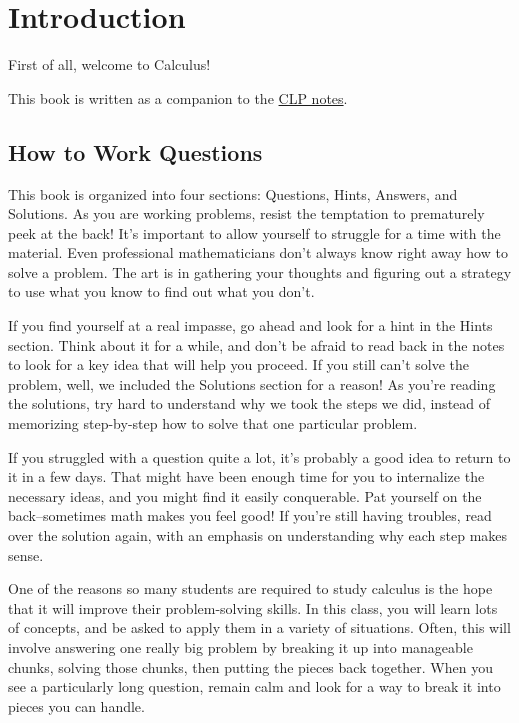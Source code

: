 \section*{Introduction}
First of all, welcome to Calculus!

This book is written as a companion to the \href{http://www.math.ubc.ca/~andrewr/maths100180/2016/CLP/clp_notes_100.pdf}{CLP notes}.

\subsection*{How to Work Questions}

This book is organized into four sections: Questions, Hints, Answers, and Solutions. As you are working problems, resist the temptation to prematurely peek at the back! It's important to allow yourself to struggle for a time with the material. Even professional mathematicians don't always know right away how to solve a problem. The art is in gathering your thoughts and figuring out a strategy to use what you know to find out what you don't.

If you find yourself at a real impasse, go ahead and look for a hint in the Hints section. Think about it for a while, and don't be afraid to read back in the notes to look for a key idea that will help you proceed. If you still can't solve the problem, well, we included the Solutions section for a reason! As you're reading the solutions, try hard to understand why we took the steps we did, instead of memorizing step-by-step how to solve that one particular problem.

If you struggled with a question quite a lot, it's probably a good idea to return to it in a few days. That might have been enough time for you to internalize the necessary ideas, and you might find it easily conquerable. Pat yourself on the back--sometimes math makes you feel good! If you're still having troubles, read over the solution again, with an emphasis on understanding why each step makes sense.

One of the reasons so many students are required to study calculus is the hope that it will improve their problem-solving skills. In this class, you will learn lots of concepts, and be asked to apply them in a variety of situations. Often, this will involve answering one really big problem by breaking it up into manageable chunks, solving those chunks, then putting the pieces back together. When you see a particularly long question, remain calm and look for a way to break it into pieces you can handle.

